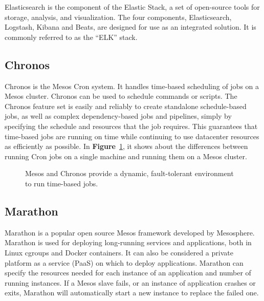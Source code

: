 \documentclass[12pt,oneside,openright,a4paper]{cpe-english-project}
\begin{document}
Elasticsearch is the component of the Elastic Stack, a set of open-source tools for storage, analysis, and visualization. The four components, Elasticsearch, Logstash, Kibana and Beats, are designed for use as an integrated solution. It is commonly referred to as the “ELK” stack.\cite{elasticsearch}

\subsection{Chronos}
Chronos is the Mesos Cron system. It handles time-based scheduling of jobs on a Mesos cluster. Chronos can be used to schedule commands or scripts. The Chronos feature set is easily and reliably to create standalone schedule-based jobs, as well as complex dependency-based jobs and pipelines, simply by specifying the schedule and resources that the job requires. This guarantees that time-based jobs are running on time while continuing to use datacenter resources as efficiently as possible. In \textbf{Figure}~\ref{fig:chronos}, it shows about the differences between running Cron jobs on a single machine and running them on a Mesos cluster.\cite{mesosInAction}

\begin{figure}[!h]\centering
\setlength{\fboxrule}{0mm} %
\setlength{\fboxsep}{0cm}
\caption{Mesos and Chronos provide a dynamic, fault-tolerant environment to run time-based jobs. \cite{mesosInAction}}\label{fig:chronos}
\end{figure}

\subsection{Marathon}
Marathon is a popular open source Mesos framework developed by Mesosphere. Marathon is used for deploying long-running services and applications, both in Linux cgroups and Docker containers. It can also be considered a private platform as a service (PaaS) on which to deploy applications. Marathon can specify the resources needed for each instance of an application and number of running instances. If a Mesos slave fails, or an instance of application crashes or exits, Marathon will automatically start a new instance to replace the failed one.
\end{document}
